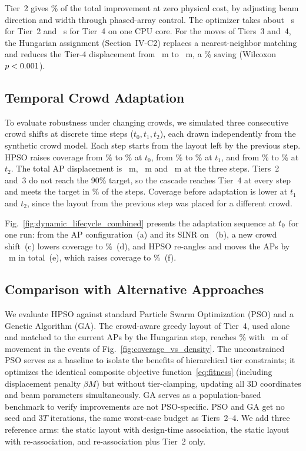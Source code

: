 \documentclass[conference]{IEEEtran}
\begin{document}
	Tier~2 gives \TierTwoShare\% of the total improvement at zero physical cost, by adjusting beam direction and width through phased-array control. The optimizer takes about \TierWallTwo~s for Tier~2 and \TierWallFour~s for Tier~4 on one CPU core. For the moves of Tiers~3 and~4, the Hungarian assignment (Section~IV-C2) replaces a nearest-neighbor matching and reduces the Tier-4 displacement from \HungNN~m to \HungHu~m, a \HungSavingPct\% saving (Wilcoxon $p <0.001$).

	\subsection{Temporal Crowd Adaptation}

	To evaluate robustness under changing crowds, we simulated three consecutive crowd shifts at discrete time steps ($t_0, t_1, t_2$), each drawn independently from the synthetic crowd model. Each step starts from the layout left by the previous step. HPSO raises coverage from \SeqTmBeforeA\% to \SeqTmAfterA\% at $t_0$, from \SeqTmBeforeB\% to \SeqTmAfterB\% at $t_1$, and from \SeqTmBeforeC\% to \SeqTmAfterC\% at $t_2$. The total AP displacement is \SeqTmDispA~m, \SeqTmDispB~m and \SeqTmDispC~m at the three steps. Tiers~2 and~3 do not reach the 90\% target, so the cascade reaches Tier~4 at every step and meets the target in \SeqTmReach\% of the steps. Coverage before adaptation is lower at $t_1$ and $t_2$, since the layout from the previous step was placed for a different crowd.

	Fig.~\ref{fig:dynamic_lifecycle_combined} presents the adaptation sequence at $t_{0}$ for one run: from the \FigTwoLayout{} AP configuration~(a) and its SINR on \FigTwoPrevStep{}~(b), a new crowd shift~(c) lowers coverage to \FigTwoBefore\%~(d), and HPSO re-angles and moves the APs by \FigTwoDisp~m in total~(e), which raises coverage to \FigTwoAfter\%~(f).

	\subsection{Comparison with Alternative Approaches}

	We evaluate HPSO against standard Particle Swarm Optimization (PSO) and a Genetic Algorithm (GA). The crowd-aware greedy layout of Tier~4, used alone and matched to the current APs by the Hungarian step, reaches \DenGrCovAll\% with \DenGrDispAll~m of movement in the events of Fig.~\ref{fig:coverage_vs_density}. The unconstrained PSO serves as a baseline to isolate the benefits of hierarchical tier constraints; it optimizes the identical composite objective function~\eqref{eq:fitness} (including displacement penalty $\beta M$) but without tier-clamping, updating all 3D coordinates and beam parameters simultaneously. GA serves as a population-based benchmark to verify improvements are not PSO-specific. PSO and GA get no seed and $3T$ iterations, the same worst-case budget as Tiers~2--4. We add three reference arms: the static layout with design-time association, the static layout with re-association, and re-association plus Tier~2 only.
\end{document}
